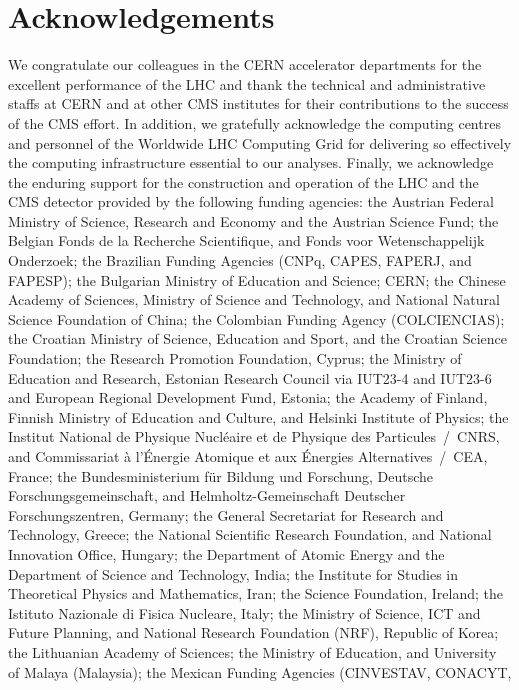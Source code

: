 {{{\section*{Acknowledgements}
We congratulate our colleagues in the CERN accelerator departments for
the excellent performance of the LHC and thank the technical and
administrative staffs at CERN and at other CMS institutes for their
contributions to the success of the CMS effort. In addition, we
gratefully acknowledge the computing centres and personnel of the
Worldwide LHC Computing Grid for delivering so effectively the
computing infrastructure essential to our analyses. Finally, we
acknowledge the enduring support for the construction and operation of
the LHC and the CMS detector provided by the following funding
agencies: the Austrian Federal Ministry of Science, Research and
Economy and the Austrian Science Fund; the Belgian Fonds de la
Recherche Scientifique, and Fonds voor Wetenschappelijk Onderzoek; the
Brazilian Funding Agencies (CNPq, CAPES, FAPERJ, and FAPESP); the
Bulgarian Ministry of Education and Science; CERN; the Chinese Academy
of Sciences, Ministry of Science and Technology, and National Natural
Science Foundation of China; the Colombian Funding Agency
(COLCIENCIAS); the Croatian Ministry of Science, Education and Sport,
and the Croatian Science Foundation; the Research Promotion
Foundation, Cyprus; the Ministry of Education and Research, Estonian
Research Council via IUT23-4 and IUT23-6 and European Regional
Development Fund, Estonia; the Academy of Finland, Finnish Ministry of
Education and Culture, and Helsinki Institute of Physics; the Institut
National de Physique Nucl\'eaire et de Physique des Particules~/~CNRS,
and Commissariat \`a l'\'Energie Atomique et aux \'Energies
Alternatives~/~CEA, France; the Bundesministerium f\"ur Bildung und
Forschung, Deutsche Forschungsgemeinschaft, and Helmholtz-Gemeinschaft
Deutscher Forschungszentren, Germany; the General Secretariat for
Research and Technology, Greece; the National Scientific Research
Foundation, and National Innovation Office, Hungary; the Department of
Atomic Energy and the Department of Science and Technology, India; the
Institute for Studies in Theoretical Physics and Mathematics, Iran;
the Science Foundation, Ireland; the Istituto Nazionale di Fisica
Nucleare, Italy; the Ministry of Science, ICT and Future Planning, and
National Research Foundation (NRF), Republic of Korea; the Lithuanian
Academy of Sciences; the Ministry of Education, and University of
Malaya (Malaysia); the Mexican Funding Agencies (CINVESTAV, CONACYT,
}}}
